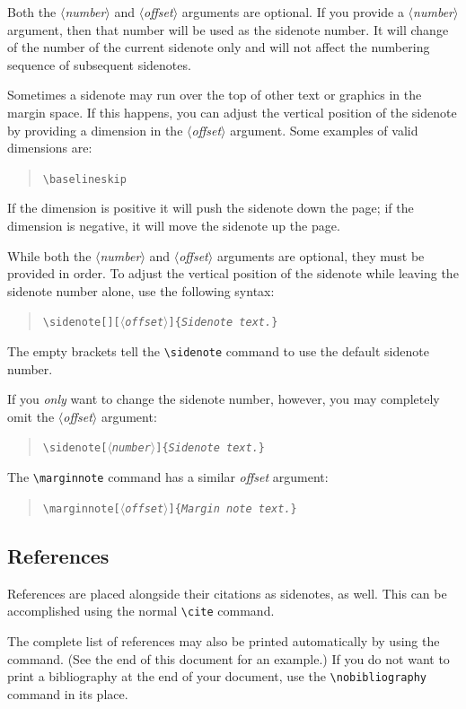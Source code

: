 \documentclass{tufte-handout}
\newcommand{\doccmd}[1]{\texttt{\textbackslash#1}}%
\newcommand{\docopt}[1]{\ensuremath{\langle}\textrm{\textit{#1}}\ensuremath{\rangle}}%
\newcommand{\docarg}[1]{\textrm{\textit{#1}}}%
\newenvironment{docspec}{\begin{quote}\noindent}{\end{quote}}%
\begin{document}
Both the \docopt{number} and \docopt{offset} arguments are optional.  If you
provide a \docopt{number} argument, then that number will be used as the
sidenote number.  It will change of the number of the current sidenote only and
will not affect the numbering sequence of subsequent sidenotes.

Sometimes a sidenote may run over the top of other text or graphics in the
margin space.  If this happens, you can adjust the vertical position of the
sidenote by providing a dimension in the \docopt{offset} argument.  Some
examples of valid dimensions are:
\begin{docspec}
  \ttfamily 1.0in \qquad 2.54cm \qquad 254mm \Verb|\baselineskip|
\end{docspec}
If the dimension is positive it will push the sidenote down the page; if the
dimension is negative, it will move the sidenote up the page.

While both the \docopt{number} and \docopt{offset} arguments are optional, they
must be provided in order.  To adjust the vertical position of the sidenote
while leaving the sidenote number alone, use the following syntax:
\begin{docspec}
  \doccmd{sidenote[][\docopt{offset}]\{\docarg{Sidenote text.}\}}
\end{docspec}
The empty brackets tell the \Verb|\sidenote| command to use the default
sidenote number.

If you \emph{only} want to change the sidenote number, however, you may
completely omit the \docopt{offset} argument:
\begin{docspec}
  \doccmd{sidenote[\docopt{number}]\{\docarg{Sidenote text.}\}}
\end{docspec}

The \Verb|\marginnote| command has a similar \docarg{offset} argument:
\begin{docspec}
  \doccmd{marginnote[\docopt{offset}]\{\docarg{Margin note text.}\}}
\end{docspec}

\subsection{References}
References are placed alongside their citations as sidenotes,
as well.  This can be accomplished using the normal \Verb|\cite|
command.

The complete list of references may also be printed automatically by using
the \Verb|| command.  (See the end of this document for an
example.)  If you do not want to print a bibliography at the end of your
document, use the \Verb|\nobibliography| command in its place.  
\end{document}
